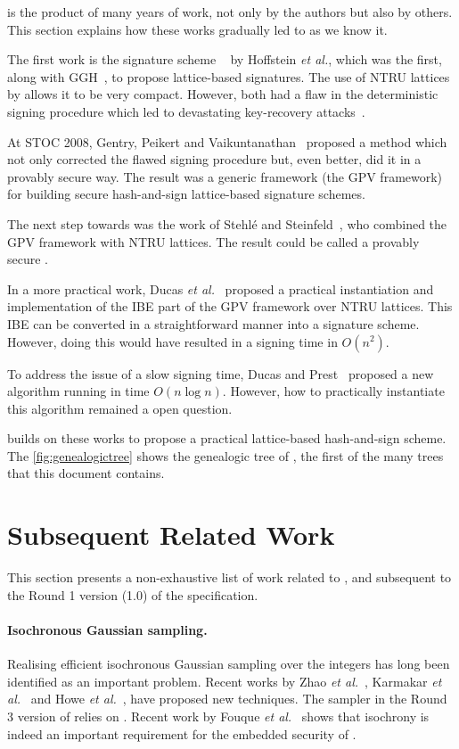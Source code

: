 \falcon is the product of many years of work, not only by the authors but also by others. This section explains how these works gradually led to \falcon as we know it.

The first work is the signature scheme \ntrusign~\cite{RSA:HHPSW03} by Hoffstein \textit{et al.}, which was the first, along with GGH~\cite{C:GolGolHal97b}, to propose lattice-based signatures. The use of NTRU lattices by \ntrusign allows it to be very compact. However, both had a flaw in the deterministic signing procedure which led to devastating key-recovery attacks~\cite{EC:NguReg06,AC:DucNgu12b}.

At STOC 2008, Gentry, Peikert and Vaikuntanathan~\cite{STOC:GenPeiVai08} proposed a method which not only corrected the flawed signing procedure but, even better, did it in a provably secure way. The result was a generic framework (the GPV framework) for building secure hash-and-sign lattice-based signature schemes.

The next step towards \falcon was the work of Stehl\'e and Steinfeld~\cite{EC:SteSte11}, who combined the GPV framework with NTRU lattices. The result could be called a provably secure \ntrusign.

In a more practical work, Ducas \textit{et al.}~\cite{AC:DucLyuPre14} proposed a practical instantiation and implementation of the IBE part of the GPV framework over NTRU lattices. This IBE
can be converted in a straightforward manner into a signature scheme. However, doing this would have resulted in a signing time in $O(n^2)$.

To address the issue of a slow signing time, Ducas and Prest~\cite{ISSAC:DucPre16} proposed a new algorithm running in time $O(n \log n)$. However, how to practically instantiate this algorithm remained a open question.

\falcon builds on these works to propose a practical lattice-based hash-and-sign scheme. The \cref{fig:genealogictree} shows the genealogic tree of \falcon, the first of the many trees that this document contains.


\section{Subsequent Related Work}\label{sec:related}

This section presents a non-exhaustive list of work related to \falcon, and subsequent to the Round 1 version (1.0) of the specification.

\paragraph{Isochronous Gaussian sampling.} Realising efficient isochronous Gaussian sampling over the integers has long been identified as an important problem. Recent works by Zhao \textit{et al.}~\cite{TC:ZhaSteSak20}, Karmakar \textit{et al.}~\cite{DAC:KSVV19} and Howe \textit{et al.}~\cite{PQCRYPTO:HPRR20}, have proposed new techniques. The sampler in the Round 3 version of \falcon relies on \cite{TC:ZhaSteSak20,PQCRYPTO:HPRR20}. Recent work by Fouque \textit{et al.}~\cite{EC:FKTWY20} shows that isochrony is indeed an important requirement for the embedded security of \falcon.

